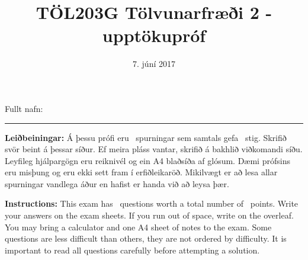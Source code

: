 \documentclass[addpoints]{exam}
\author{}
\date{}
\title{TÖL203G Tölvunarfræði 2 - upptökupróf}
\author{}
\date{7. júní 2017}
\begin{document}
Fullt nafn: \vspace*{1mm} \hrule

\begin{center}
\begin{minipage}{.8\textwidth}

\vspace{5cm}

\textbf{Leiðbeiningar:} Á þessu prófi eru \numquestions\ spurningar sem samtals gefa \numpoints\ stig. 
Skrifið svör beint á þessar síður. 
Ef meira pláss vantar, skrifið á bakhlið viðkomandi síðu. 
Leyfileg hjálpargögn eru reiknivél og ein A4 blaðsíða af glósum. 
Dæmi prófsins eru misþung og eru ekki sett fram í erfiðleikaröð. 
Mikilvægt er að lesa allar spurningar vandlega áður en hafist er handa við að leysa þær.

\vspace{0.5cm}

\textbf{Instructions:} This exam has \numquestions\ questions worth a total number of \numpoints\ points. 
Write your answers on the exam sheets. 
If you run out of space, write on the overleaf. 
You may bring a calculator and one A4 sheet of notes to the exam. 
Some questions are less difficult than others, they are not ordered by difficulty. 
It is important to read all questions carefully before attempting a solution. 
\end{minipage}
\end{center}

\vfill
\begin{center}
\cellwidth{1.5em}
\gradetable[h][questions]
\end{center}

\newpage
\end{document}
